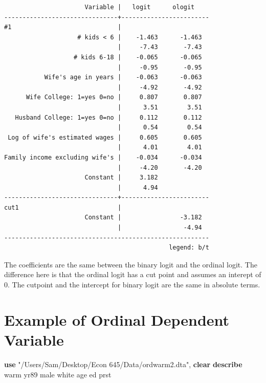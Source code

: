 \documentclass[
]{book}
\newenvironment{Shaded}{\begin{snugshade}}{\end{snugshade}}
\newcommand{\BaseNTok}[1]{\textcolor[rgb]{0.00,0.00,0.81}{#1}}
\newcommand{\KeywordTok}[1]{\textcolor[rgb]{0.13,0.29,0.53}{\textbf{#1}}}
\newcommand{\NormalTok}[1]{#1}
\newcommand{\StringTok}[1]{\textcolor[rgb]{0.31,0.60,0.02}{#1}}
\begin{document}
\begin{verbatim}
                      Variable |   logit      ologit    
-------------------------------+------------------------
#1                             |
                    # kids < 6 |    -1.463      -1.463  
                               |     -7.43       -7.43  
                   # kids 6-18 |    -0.065      -0.065  
                               |     -0.95       -0.95  
           Wife's age in years |    -0.063      -0.063  
                               |     -4.92       -4.92  
      Wife College: 1=yes 0=no |     0.807       0.807  
                               |      3.51        3.51  
   Husband College: 1=yes 0=no |     0.112       0.112  
                               |      0.54        0.54  
 Log of wife's estimated wages |     0.605       0.605  
                               |      4.01        4.01  
Family income excluding wife's |    -0.034      -0.034  
                               |     -4.20       -4.20  
                      Constant |     3.182              
                               |      4.94              
-------------------------------+------------------------
cut1                           |
                      Constant |                -3.182  
                               |                 -4.94  
--------------------------------------------------------
                                             legend: b/t
\end{verbatim}

The coefficients are the same between the binary logit and the ordinal logit. The difference here is that the ordinal logit has a cut point and assumes an interept of 0. The cutpoint and the intercept for binary logit are the same in absolute terms.

\section{Example of Ordinal Dependent Variable}\label{example-of-ordinal-dependent-variable}

\begin{Shaded}
\begin{Highlighting}[]
\KeywordTok{use} \StringTok{"/Users/Sam/Desktop/Econ 645/Data/ordwarm2.dta"}\NormalTok{, }\KeywordTok{clear}
\KeywordTok{describe}\NormalTok{ warm yr89 male }\BaseNTok{white}\NormalTok{ age ed prst}
\end{Highlighting}
\end{Shaded}
\end{document}
